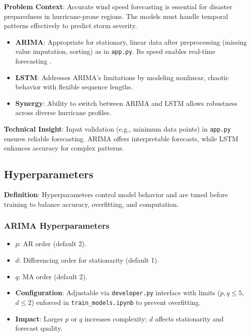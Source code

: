 \textbf{Problem Context}: Accurate wind speed forecasting is essential for disaster preparedness in hurricane-prone regions. The models must handle temporal patterns effectively to predict storm severity.

\begin{itemize}
	\item \textbf{ARIMA}: Appropriate for stationary, linear data after preprocessing (missing value imputation, sorting) as in \texttt{app.py}. Its speed enables real-time forecasting \cite{HyndmanAthanasopoulos2021}.
	\item \textbf{LSTM}: Addresses ARIMA’s limitations by modeling nonlinear, chaotic behavior with flexible sequence lengths.
	\item \textbf{Synergy}: Ability to switch between ARIMA and LSTM allows robustness across diverse hurricane profiles.
\end{itemize}

\textbf{Technical Insight}: Input validation (e.g., minimum data points) in \texttt{app.py} ensures reliable forecasting. ARIMA offers interpretable forecasts, while LSTM enhances accuracy for complex patterns.

\subsection{Hyperparameters}

\textbf{Definition}: Hyperparameters control model behavior and are tuned before training to balance accuracy, overfitting, and computation.

\subsubsection{ARIMA Hyperparameters}

\begin{itemize}
	\item $p$: AR order (default 2).
	\item $d$: Differencing order for stationarity (default 1).
	\item $q$: MA order (default 2).
	\item \textbf{Configuration}: Adjustable via \texttt{developer.py} interface with limits ($p, q \leq 5$, $d \leq 2$) enforced in \texttt{train\_models.ipynb} to prevent overfitting.
	\item \textbf{Impact}: Larger $p$ or $q$ increases complexity; $d$ affects stationarity and forecast quality.
\end{itemize}

